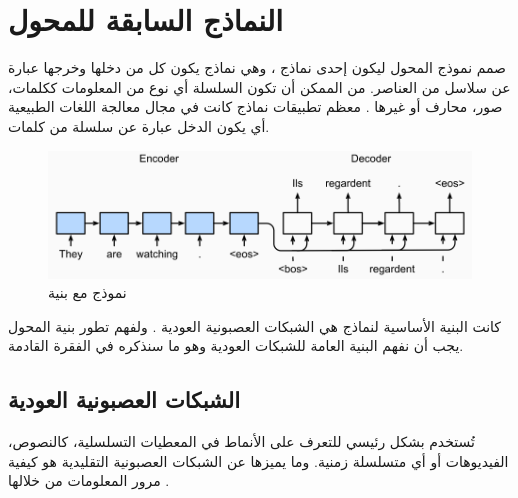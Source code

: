 \section{النماذج السابقة للمحول}
صمم نموذج المحول
ليكون إحدى نماذج
،
وهي نماذج يكون كل من دخلها وخرجها عبارة عن سلاسل من العناصر. من الممكن أن تكون السلسلة أي نوع من المعلومات ككلمات، صور، محارف أو غيرها
.
\newline
معظم تطبيقات نماذج
 كانت في مجال معالجة اللغات الطبيعية
 أي يكون الدخل عبارة عن سلسلة من كلمات.
\begin{figure}[h!]
\centerline{
	\includegraphics[width=\textwidth]{images/RNN.png}}
\caption{نموذج
مع بنية
}
\label{fig:RNN1}	
\end{figure}
كانت البنية الأساسية لنماذج
هي الشبكات العصبونية العودية
.
ولفهم تطور بنية المحول يجب أن نفهم البنية العامة للشبكات العودية وهو ما سنذكره في الفقرة القادمة.
\newline
\subsection{الشبكات العصبونية العودية
}
تُستخدم
 بشكل رئيسي للتعرف على الأنماط في المعطيات التسلسلية، كالنصوص، الفيديوهات أو أي متسلسلة زمنية. وما يميزها
 عن الشبكات العصبونية التقليدية
 هو كيفية مرور المعلومات من خلالها
.

